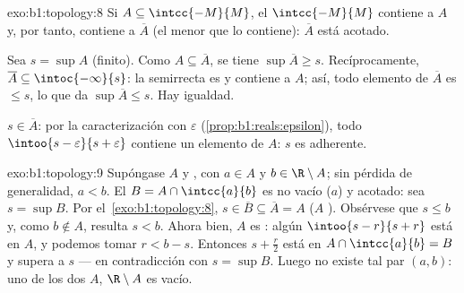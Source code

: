 \begin{solution}{exo:b1:topology:8}
Si $A \subseteq \intcc{-M}{M}$, el  $\intcc{-M}{M}$ contiene a
$A$ y, por tanto, contiene a $\overline A$ (el menor  que lo
contiene): $\overline A$ está acotado.

Sea $s = \sup A$ (finito). Como $A \subseteq \overline A$, se tiene
$\sup \overline A \geq s$. Recíprocamente,
$\overline A \subseteq \intoc{-\infty}{s}$: la semirrecta es 
y contiene a $A$; así, todo elemento de $\overline A$ es $\leq s$, lo
que da $\sup\overline A \leq s$. Hay igualdad.

$s \in \overline A$: por la caracterización con $\varepsilon$
(\cref{prop:b1:reals:epsilon}), todo 
$\intoo{s - \varepsilon}{s + \varepsilon}$ contiene un elemento de
$A$: $s$ es adherente.
\end{solution}

\begin{solution}{exo:b1:topology:9}
Supóngase $A$  y , con $a \in A$ y
$b \in \R \setminus A$; sin pérdida de generalidad, $a < b$. El
 $B = A \cap \intcc{a}{b}$ es no vacío ($a$) y acotado: sea
$s = \sup B$. Por el~\cref{exo:b1:topology:8},
$s \in \overline B \subseteq \overline A = A$ ($A$ ).
Obsérvese que $s \leq b$ y, como $b \notin A$, resulta $s < b$. Ahora
bien, $A$ es : algún  $\intoo{s - r}{s + r}$ está en
$A$, y podemos tomar $r < b - s$. Entonces $s + \frac{r}{2}$ está en
$A \cap \intcc{a}{b} = B$ y supera a $s$ --- en contradicción con
$s = \sup B$. Luego no existe tal par $(a, b)$: uno de los dos
 $A$, $\R \setminus A$ es vacío.
\end{solution}

